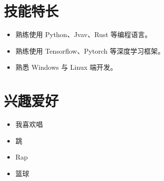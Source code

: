 \documentclass[11pt]{article}
\newlength{\iconwidth}
\begin{document}
    \begin{minipage}[t]{0.6\textwidth}
        \section[技能特长]{\quad 技能特长}
        \begin{itemize}
        \setlength{\itemsep}{0.5em}
            \item 熟练使用 Python、Jvav、Rust 等编程语言。
            \item 熟练使用 Tensorflow、Pytorch 等深度学习框架。
            \item 熟悉 Windows 与 Linux 端开发。
        \end{itemize}
    \end{minipage}
    \hfill
    \begin{minipage}[t]{0.35\textwidth}
        \section[兴趣爱好]{\quad 兴趣爱好}
        \begin{itemize}
        \setlength{\itemsep}{0.5em}
            \item 我喜欢唱
            \item 跳
            \item Rap
            \item 篮球
        \end{itemize}
    \end{minipage}
    
    
\end{document}
